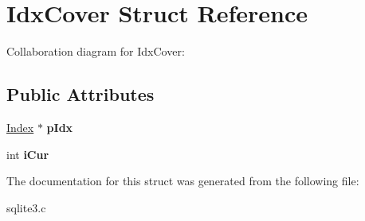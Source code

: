 \hypertarget{structIdxCover}{}\section{Idx\+Cover Struct Reference}
\label{structIdxCover}


Collaboration diagram for Idx\+Cover\+:
\subsection*{Public Attributes}
\begin{DoxyCompactItemize}
\item 
\hyperlink{structIndex}{Index} $\ast$ {\bfseries p\+Idx}\hypertarget{structIdxCover_a5ccfb55ea6898b63aee5626a6ee5365e}{}\label{structIdxCover_a5ccfb55ea6898b63aee5626a6ee5365e}

\item 
int {\bfseries i\+Cur}\hypertarget{structIdxCover_ab7d59e1b07eecac9aaf9bcd9f7d8edc0}{}\label{structIdxCover_ab7d59e1b07eecac9aaf9bcd9f7d8edc0}

\end{DoxyCompactItemize}


The documentation for this struct was generated from the following file\+:\begin{DoxyCompactItemize}
\item 
sqlite3.\+c\end{DoxyCompactItemize}
